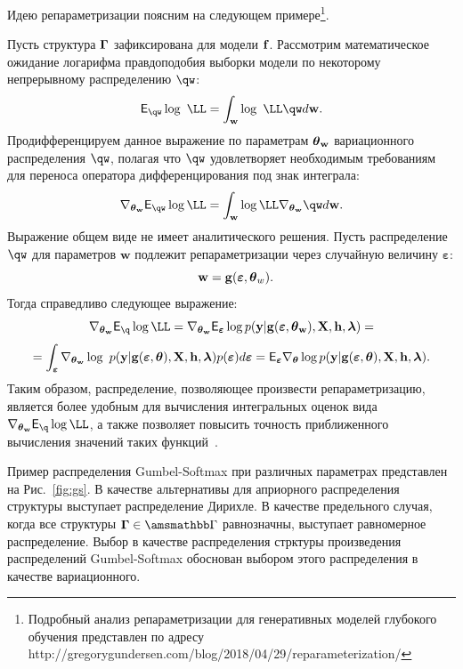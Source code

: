 Идею репараметризации поясним на следующем примере\footnote{Подробный анализ репараметризации для генеративных моделей глубокого обучения представлен по адресу http://gregorygundersen.com/blog/2018/04/29/reparameterization/}.
\begin{example} Пусть структура $\boldsymbol{\Gamma}$ зафиксирована для модели $\mathbf{f}$. Рассмотрим математическое ожидание логарифма правдоподобия выборки модели по некоторому непрерывному распределению $\qw$:
\[
    \E_{\qw} \log~\LL=  \int_{\w} \log~\LL \qw d\w.
\]
Продифференцируем данное выражение по параметрам $\boldsymbol{\theta}_\mathbf{w}$ вариационного распределения $\qw$, полагая что $\qw$ удовлетворяет необходимым требованиям для переноса оператора дифференцирования под знак интеграла:
\[
    \nabla_{\tetaw} \E_{\qw} \log \LL = 
\int_{\w}  \log \LL \nabla_{\tetaw}\qw d\w.
\]
Выражение общем виде не имеет аналитического решения. Пусть распределение $\qw$ для параметров $\mathbf{w}$ подлежит репараметризации через случайную величину $\boldsymbol{\varepsilon}$:
\[
    \w = \mathbf{g}(\boldsymbol{\varepsilon}, \teta_w).
\] 
Тогда справедливо следующее выражение:
\[
 \nabla_{\tetaw} \E_{\q} \log \LL = \nabla_{\tetaw} \E_{\boldsymbol{\varepsilon}} \log p(\y|\mathbf{g}(\boldsymbol{\varepsilon}, \tetaw), \X, \h, \lam) =
\]
\[= \int_{\boldsymbol{\varepsilon}}\nabla_{\boldsymbol{\theta}_\mathbf{w}} \log~p(\mathbf{y}|\mathbf{g}(\boldsymbol{\varepsilon},\boldsymbol{\theta}), \mathbf{X}, \mathbf{h},\boldsymbol{\lambda}) p(\boldsymbol{\varepsilon}) d\boldsymbol{\varepsilon}=\mathsf{E}_{\boldsymbol{\varepsilon}} \nabla_{\boldsymbol{\theta}} \log p(\mathbf{y}|\mathbf{g}(\boldsymbol{\varepsilon}, \boldsymbol{\theta}), \mathbf{X}, \mathbf{h}, \boldsymbol{\lambda}).\]
Таким образом, распределение, позволяющее произвести репараметризацию, является более удобным для вычисления интегральных оценок вида $ \nabla_{\tetaw} \E_{\q} \log \LL$, а также позволяет повысить точность приближенного вычисления значений таких функций~\cite{reparametrization}.
\end{example}

Пример распределения Gumbel-Softmax при различных параметрах представлен на Рис.~\ref{fig:gs}. В качестве альтернативы для априорного распределения структуры выступает  распределение Дирихле. В качестве предельного случая, когда все структуры $\G \in \Gb$ равнозначны, выступает равномерное распределение. Выбор в качестве распределения стрктуры произведения распределений Gumbel-Softmax  обоснован выбором этого распределения в качестве вариационного. 

